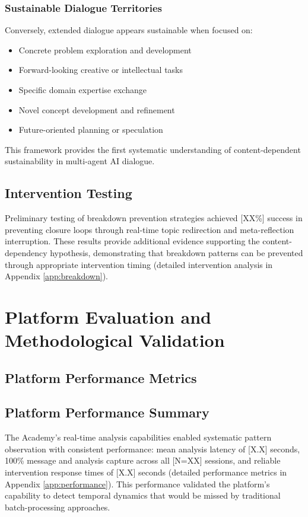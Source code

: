 \documentclass[11pt,letterpaper]{article}
\newcommand{\theacademy}{The Academy}
\newcommand{\totalSessions}{[N=XX]} %
\newcommand{\interventionSuccessRate}{[XX\%]} %
\begin{document}
\subsubsection{Sustainable Dialogue Territories}
Conversely, extended dialogue appears sustainable when focused on:
\begin{itemize}
    \item Concrete problem exploration and development
    \item Forward-looking creative or intellectual tasks
    \item Specific domain expertise exchange
    \item Novel concept development and refinement
    \item Future-oriented planning or speculation
\end{itemize}

This framework provides the first systematic understanding of content-dependent sustainability in multi-agent AI dialogue.

\subsection{Intervention Testing}

Preliminary testing of breakdown prevention strategies achieved \interventionSuccessRate{} success in preventing closure loops through real-time topic redirection and meta-reflection interruption. These results provide additional evidence supporting the content-dependency hypothesis, demonstrating that breakdown patterns can be prevented through appropriate intervention timing (detailed intervention analysis in Appendix \ref{app:breakdown}).

\section{Platform Evaluation and Methodological Validation}

\subsection{Platform Performance Metrics}

\subsection{Platform Performance Summary}

\theacademy{}'s real-time analysis capabilities enabled systematic pattern observation with consistent performance: mean analysis latency of [X.X] seconds, 100\% message and analysis capture across all \totalSessions{} sessions, and reliable intervention response times of [X.X] seconds (detailed performance metrics in Appendix \ref{app:performance}). This performance validated the platform's capability to detect temporal dynamics that would be missed by traditional batch-processing approaches.
\end{document}
